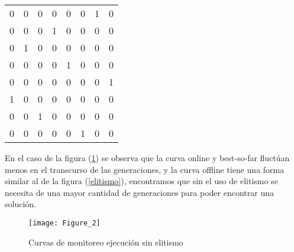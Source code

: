\documentclass[11pt]{article}
\begin{document}
\begin{center}
\begin{tabular}{ c c c c c c c c }
	0 & 0 & 0 & 0 & 0 & 0 & 1 & 0\\
	0 & 0 & 0 & 1 & 0 & 0 & 0 & 0\\
	0 & 1 & 0 & 0 & 0 & 0 & 0 & 0\\
	0 & 0 & 0 & 0 & 1 & 0 & 0 & 0\\
	0 & 0 & 0 & 0 & 0 & 0 & 0 & 1\\
	1 & 0 & 0 & 0 & 0 & 0 & 0 & 0\\
	0 & 0 & 1 & 0 & 0 & 0 & 0 & 0\\
	0 & 0 & 0 & 0 & 0 & 1 & 0 & 0
\end{tabular}
\end{center}
En el caso de la figura (\ref{sinelitismo}) se observa que la curva online y best-so-far fluct\'uan menos en el transcurso de las generaciones, y la curva offline tiene una forma similar al de la figura (\ref{elitismo}), encontramos que sin el uso de elitismo se necesita de una mayor cantidad de generaciones para poder encontrar una soluci\'on.
\begin{figure}[h]
    \texttt{[image: Figure\_2]}
    \centering
    \caption{Curvas de monitoreo ejecuci\'on sin elitismo}
    \label{sinelitismo}
    \end{figure}
\end{document}
